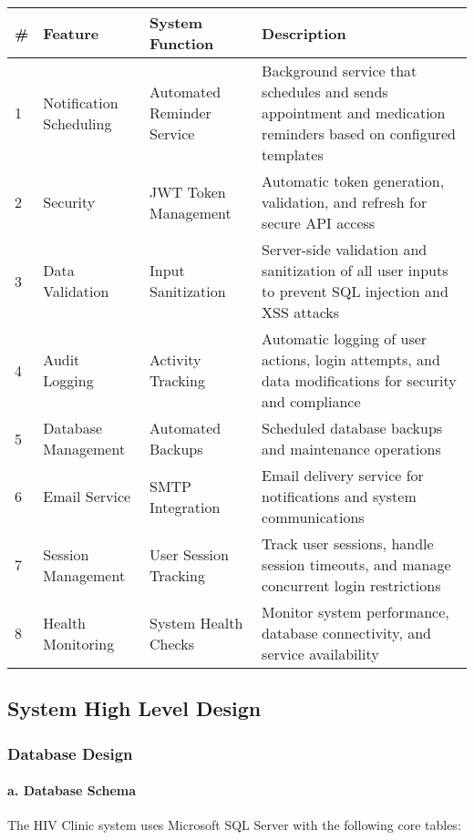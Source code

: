 \documentclass[12pt,a4paper]{article}
\begin{document}
\begin{longtable}{|p{1cm}|p{4cm}|p{4cm}|p{5cm}|}
\hline
\textbf{\#} & \textbf{Feature} & \textbf{System Function} & \textbf{Description} \\
\hline
1 & Notification Scheduling & Automated Reminder Service & Background service that schedules and sends appointment and medication reminders based on configured templates \\
\hline
2 & Security & JWT Token Management & Automatic token generation, validation, and refresh for secure API access \\
\hline
3 & Data Validation & Input Sanitization & Server-side validation and sanitization of all user inputs to prevent SQL injection and XSS attacks \\
\hline
4 & Audit Logging & Activity Tracking & Automatic logging of user actions, login attempts, and data modifications for security and compliance \\
\hline
5 & Database Management & Automated Backups & Scheduled database backups and maintenance operations \\
\hline
6 & Email Service & SMTP Integration & Email delivery service for notifications and system communications \\
\hline
7 & Session Management & User Session Tracking & Track user sessions, handle session timeouts, and manage concurrent login restrictions \\
\hline
8 & Health Monitoring & System Health Checks & Monitor system performance, database connectivity, and service availability \\
\hline
\end{longtable}

\subsection{System High Level Design}

\subsubsection{Database Design}

\paragraph{a. Database Schema}

The HIV Clinic system uses Microsoft SQL Server with the following core tables:
\end{document}
